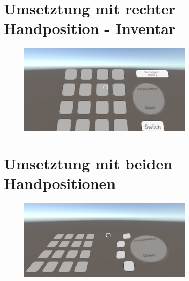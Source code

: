 	\section{Umsetztung mit rechter Handposition - Inventar}\label{chapter:bildRI}
	\begin{figure}[htbp]
		\centering
		\includegraphics[width=0.75\textwidth]{Fragen/UmsetzungR2.png}
	\end{figure}
	\newpage
	
	\section{Umsetztung mit beiden Handpositionen}\label{chapter:bildB}
	\begin{figure}[htbp]
		\centering
		\includegraphics[width=0.75\textwidth]{Fragen/UmsetzungB1.png}
	\end{figure}